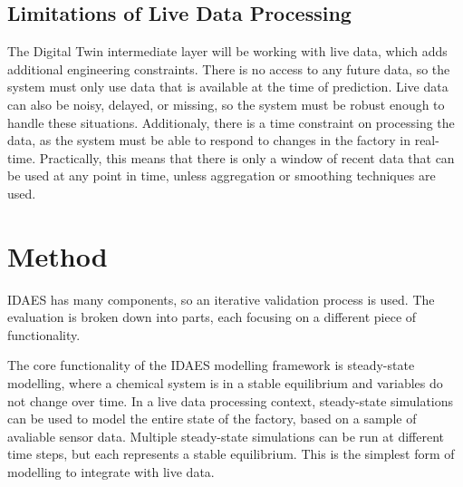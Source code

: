 \documentclass[12pt]{article}
\begin{document}
\subsection{Limitations of Live Data Processing} \label{sec:limitations_framework}


The Digital Twin intermediate layer will be working with live data, which adds additional engineering constraints. There is no access to any future data, so the system must only use data that is available at the time of prediction. Live data can also be noisy, delayed, or missing, so the system must be robust enough to handle these situations. Additionaly, there is a time constraint on processing the data, as the system must be able to respond to changes in the factory in real-time. Practically, this means that there is only a window of recent data that can be used at any point in time, unless aggregation or smoothing techniques are used.

\section{Method}

IDAES has many components, so an iterative validation process is used. The evaluation is broken down into parts, each focusing on a different piece of functionality. 

The core functionality of the IDAES modelling framework is steady-state modelling, where a chemical system is in a stable equilibrium and variables do not change over time. In a live data processing context, steady-state simulations can be used to model the entire state of the factory, based on a sample of avaliable sensor data. Multiple steady-state simulations can be run at different time steps, but each represents a stable equilibrium. This is the simplest form of modelling to integrate with live data. 
\end{document}
